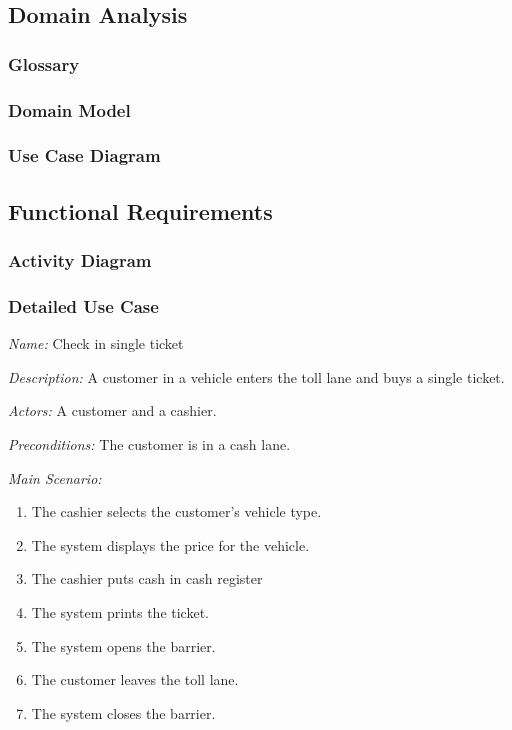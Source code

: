 \subsection {Domain Analysis}
\subsubsection{Glossary}


\subsubsection{Domain Model}



\subsubsection {Use Case Diagram}

\subsection{Functional Requirements}

\subsubsection{Activity Diagram}

\subsubsection{Detailed Use Case}



\textit {Name: } Check in single ticket

\textit {Description: } A customer in a vehicle enters the toll lane and buys a single ticket.

\textit {Actors: } A customer and a cashier.

\textit {Preconditions: }  The customer is in a cash lane.

\textit{Main Scenario: }

\begin{enumerate}
	\item The cashier selects the customer's vehicle type.
	\item The system displays the price for the vehicle.
	\item The cashier puts cash in cash register
	\item The system prints the ticket.
	\item The system opens the barrier.
	\item The customer leaves the toll lane.
	\item The system closes the barrier.
\end{enumerate}

